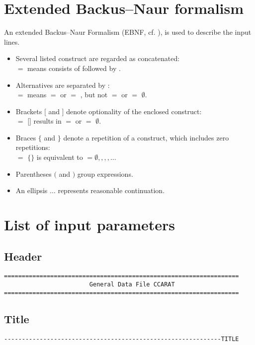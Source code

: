 \section[EBNF]{Extended Backus--Naur formalism}\label{inparams:sec:ebnf}
An extended Backus--Naur Formalism (EBNF, cf. \cite{inparams:reiser94}), is used to describe the input lines. 

\begin{itemize}
\item Several listed construct are regarded as concatenated:\\
   $=$  means  consists of  followed by .
\item Alternatives are separated by \kor{}:\\
   $=$  \kor {} means  $=$  or  $=$ ,
  but not  
   $=$  or  $=$ $\emptyset$\@. 
\item Brackets $[$ and $]$ denote optionality of the enclosed 
  construct:\\
   $=$ $[$$]$ results in  $=$  or  $=$
  $\emptyset$\@. 
\item Braces $\{$ and $\}$ denote a repetition of a construct, 
  which includes zero repetitions:\\
   $=$ $\{$$\}$ is equivalent to  $=
  \emptyset,$$,$$,$$,\ldots$
\item Parentheses $($ and $)$ group expressions.
\item An ellipsis $\ldots$ represents reasonable continuation.
\end{itemize}

\section[Input parameters]{List of input parameters}

\subsection{Header}
\begin{verbatim}
==================================================================
                        General Data File CCARAT
==================================================================
\end{verbatim}

\subsection{Title}
\begin{verbatim}
-------------------------------------------------------------TITLE
\end{verbatim}



